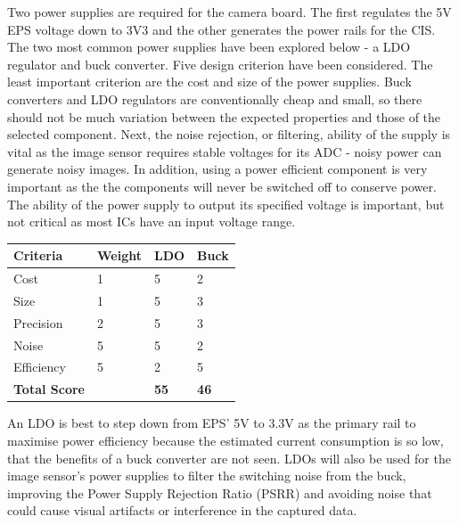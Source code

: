 Two power supplies are required for the camera board. The first regulates the 5V EPS voltage down to 3V3 and the other generates the power rails for the CIS. The two most common power supplies have been explored below - a LDO regulator and buck converter.
\nl
Five design criterion have been considered. The least important criterion are the cost and size of the power supplies. Buck converters and LDO regulators are conventionally cheap and small, so there should not be much variation between the expected properties and those of the selected component. Next, the noise rejection, or filtering, ability of the supply is vital as the image sensor requires stable voltages for its ADC - noisy power can generate noisy images. In addition, using a power efficient component is very important as the the components will never be switched off to conserve power. The ability of the power supply to output its specified voltage is important, but not critical as most ICs have an input voltage range. 

\begin{indentedtable}
    \centering
    \begin{tabular}{|l|l|l|l|}
        \hline
        \textbf{Criteria} & \textbf{Weight} & \textbf{LDO} & \textbf{Buck} \\
        \hline
        Cost & 1 & 5 & 2 \\
        \hline
        Size & 1 & 5 & 3 \\
        \hline
        Precision & 2 & 5 & 3 \\
        \hline
        Noise & 5 & 5 & 2 \\
        \hline
        Efficiency & 5 & 2 & 5 \\
        \hline
        \hline
        \textbf{Total Score} &  & \textbf{55} & \textbf{46} \\
        \hline
    \end{tabular}
    
    \caption{C2Sv1 power supply trade study between an LDO regulator and buck converter on a scale (1-5).}
    \label{tab:v1-trade-power}
\end{indentedtable}

An LDO is best to step down from EPS' 5V to 3.3V as the primary rail to maximise power efficiency because the estimated current consumption is so low, that the benefits of a buck converter are not seen. LDOs will also be used for the image sensor's power supplies to filter the switching noise from the buck, improving the Power Supply Rejection Ratio (PSRR) and avoiding noise that could cause visual artifacts or interference in the captured data.